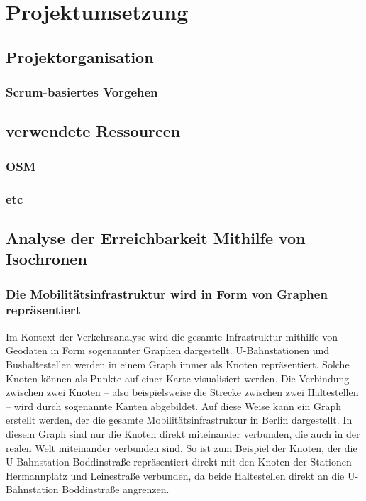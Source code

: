 \newpage
\section{Projektumsetzung} \label{infos}

\subsection{Projektorganisation}
\subsubsection{Scrum-basiertes Vorgehen}

\subsection{verwendete Ressourcen}
\subsubsection{OSM}
\subsubsection{etc}

\subsection{Analyse der Erreichbarkeit Mithilfe von Isochronen}
\subsubsection{Die Mobilitätsinfrastruktur wird in Form von Graphen repräsentiert}

Im Kontext der Verkehrsanalyse wird die gesamte Infrastruktur mithilfe von Geodaten in Form sogenannter Graphen dargestellt. U-Bahnstationen und Bushaltestellen werden in einem Graph immer als Knoten repräsentiert. Solche Knoten können als Punkte auf einer Karte visualisiert werden. Die Verbindung zwischen zwei Knoten – also beispielsweise die Strecke zwischen zwei Haltestellen – wird durch sogenannte Kanten abgebildet. Auf diese Weise kann ein Graph erstellt werden, der die gesamte Mobilitätsinfrastruktur in Berlin dargestellt. In diesem Graph sind nur die Knoten direkt miteinander verbunden, die auch in der realen Welt miteinander verbunden sind. So ist zum Beispiel der Knoten, der die U-Bahnstation Boddinstraße repräsentiert direkt mit den Knoten der Stationen Hermannplatz und Leinestraße verbunden, da beide Haltestellen direkt an die U-Bahnstation Boddinstraße angrenzen.

